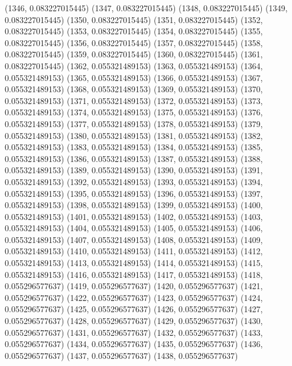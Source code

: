 {					(1346, 0.083227015445)
					(1347, 0.083227015445)
					(1348, 0.083227015445)
					(1349, 0.083227015445)
					(1350, 0.083227015445)
					(1351, 0.083227015445)
					(1352, 0.083227015445)
					(1353, 0.083227015445)
					(1354, 0.083227015445)
					(1355, 0.083227015445)
					(1356, 0.083227015445)
					(1357, 0.083227015445)
					(1358, 0.083227015445)
					(1359, 0.083227015445)
					(1360, 0.083227015445)
					(1361, 0.083227015445)
					(1362, 0.055321489153)
					(1363, 0.055321489153)
					(1364, 0.055321489153)
					(1365, 0.055321489153)
					(1366, 0.055321489153)
					(1367, 0.055321489153)
					(1368, 0.055321489153)
					(1369, 0.055321489153)
					(1370, 0.055321489153)
					(1371, 0.055321489153)
					(1372, 0.055321489153)
					(1373, 0.055321489153)
					(1374, 0.055321489153)
					(1375, 0.055321489153)
					(1376, 0.055321489153)
					(1377, 0.055321489153)
					(1378, 0.055321489153)
					(1379, 0.055321489153)
					(1380, 0.055321489153)
					(1381, 0.055321489153)
					(1382, 0.055321489153)
					(1383, 0.055321489153)
					(1384, 0.055321489153)
					(1385, 0.055321489153)
					(1386, 0.055321489153)
					(1387, 0.055321489153)
					(1388, 0.055321489153)
					(1389, 0.055321489153)
					(1390, 0.055321489153)
					(1391, 0.055321489153)
					(1392, 0.055321489153)
					(1393, 0.055321489153)
					(1394, 0.055321489153)
					(1395, 0.055321489153)
					(1396, 0.055321489153)
					(1397, 0.055321489153)
					(1398, 0.055321489153)
					(1399, 0.055321489153)
					(1400, 0.055321489153)
					(1401, 0.055321489153)
					(1402, 0.055321489153)
					(1403, 0.055321489153)
					(1404, 0.055321489153)
					(1405, 0.055321489153)
					(1406, 0.055321489153)
					(1407, 0.055321489153)
					(1408, 0.055321489153)
					(1409, 0.055321489153)
					(1410, 0.055321489153)
					(1411, 0.055321489153)
					(1412, 0.055321489153)
					(1413, 0.055321489153)
					(1414, 0.055321489153)
					(1415, 0.055321489153)
					(1416, 0.055321489153)
					(1417, 0.055321489153)
					(1418, 0.055296577637)
					(1419, 0.055296577637)
					(1420, 0.055296577637)
					(1421, 0.055296577637)
					(1422, 0.055296577637)
					(1423, 0.055296577637)
					(1424, 0.055296577637)
					(1425, 0.055296577637)
					(1426, 0.055296577637)
					(1427, 0.055296577637)
					(1428, 0.055296577637)
					(1429, 0.055296577637)
					(1430, 0.055296577637)
					(1431, 0.055296577637)
					(1432, 0.055296577637)
					(1433, 0.055296577637)
					(1434, 0.055296577637)
					(1435, 0.055296577637)
					(1436, 0.055296577637)
					(1437, 0.055296577637)
					(1438, 0.055296577637)
}
